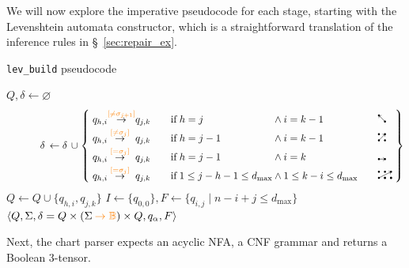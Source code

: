 \documentclass[sigplan,review,acmsmall,nonacm,screen,anonymous]{acmart}\settopmatter{printfolios=false,printccs=false,printacmref=false}
\begin{document}
\noindent We will now explore the imperative pseudocode for each stage, starting with the Levenshtein automata constructor, which is a straightforward translation of the inference rules in \S~\ref{sec:repair_ex}.

\begin{algorithm}[H]
\caption{\texttt{lev\_build} pseudocode}
\label{alg:lev_build}
\begin{algorithmic}[1]
   
  \State $Q, \delta \gets \varnothing$
    \State \vspace{-1.65cm}\[\hspace{1.15cm}\delta\,\gets \delta\,\cup\:\!\left\{
        \begin{alignedat}{9}
          &\;& q_{h,i} &\hspace{-0.1cm}\overset{{\color{orange}[\neq\sigma_{j+1}]}}{\rightarrow} &q_{j,k} &\qquad& \text{if}\;& h = j   &\:\land\:& i = k-1  &\qquad& \duparrow\\[-2pt]
          && q_{h,i}   &\overset{{\color{orange}[\neq\sigma_j]}}{\rightarrow} &q_{j,k} &&       \text{if}\;& h = j-1 &\:\land\:& i = k-1  &&       \ddiagarrow\\[-2pt]
          && q_{h,i}   &\overset{{\color{orange}[=\sigma_j]}}{\rightarrow}    &q_{j,k} &&       \text{if}\;& h = j-1 &\:\land\:& i = k    &&       \drightarrow\\[-2pt]
          && q_{h,i}   &\overset{{\color{orange}[=\sigma_j]}}{\rightarrow}    &q_{j,k} &&       \text{if}\;& 1 \leq j - h - 1 \leq d_{\max} &\:\land\:& 1 \leq k - i \leq d_{\max}   && \knightarrow\;
        \end{alignedat}
      \right\}\]
    \State $Q \gets Q \cup \{q_{h,i}, q_{j,k}\}$
  \EndFor
  \State $I \gets \{q_{0,0}\}, F \gets \{q_{i, j} \mid n - i + j \leq d_{\max}\}$
  \State \Return $\langle Q, \Sigma, \delta = Q \times (\Sigma\:{\color{orange}\rightarrow \mathbb{B}}) \times Q, q_\alpha, F\rangle$  
\end{algorithmic}
\end{algorithm}\vspace{-0.2cm}

\noindent Next, the chart parser expects an acyclic NFA, a CNF grammar and returns a Boolean 3-tensor.
\end{document}
